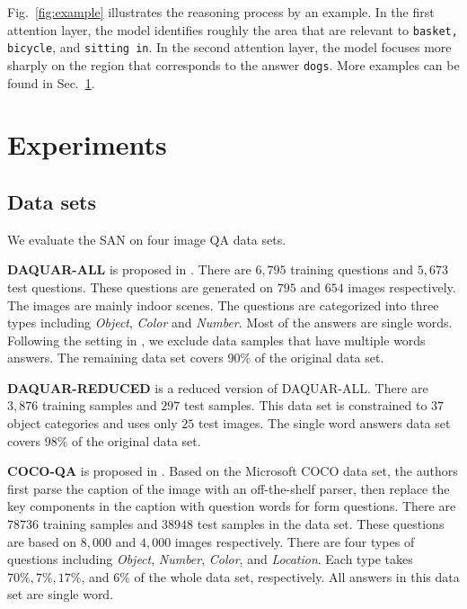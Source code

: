 \documentclass[10pt,twocolumn,letterpaper]{article}
\begin{document}
Fig.~\ref{fig:example} illustrates the reasoning process by an example. In the
first attention layer, the model identifies roughly the area that are relevant
to \texttt{basket, bicycle}, and \texttt{sitting in}. In the second attention
layer, the model focuses more sharply on the region that corresponds to the
answer \texttt{dogs}. More examples can be found in Sec.~\ref{sec:experiments}.

\section{Experiments}
\label{sec:experiments}
\subsection{Data sets}
We evaluate the SAN on four image QA data sets.

{\bf DAQUAR-ALL} is proposed in \cite{malinowski2014multi}. There are $6,795$
training questions and $5,673$ test questions. These questions are generated on
$795$ and $654$ images respectively. The images are mainly indoor scenes. The
questions are categorized into three types including \emph{Object},
\emph{Color} and \emph{Number}. Most of the answers are single words. Following
the setting in \cite{ren2015imageqa, ma2015learning, malinowski2015ask}, we
exclude data samples that have multiple words answers. The remaining data set
covers $90\%$ of the original data set.

{\bf DAQUAR-REDUCED} is a reduced version of DAQUAR-ALL. There are $3,876$
training samples and $297$ test samples. This data set is constrained to $37$
object categories and uses only $25$ test images. The single word answers data
set covers $98\%$ of the original data set.


{\bf COCO-QA} is proposed in \cite{ren2015imageqa}. Based on the Microsoft COCO
data set, the authors first parse the caption of the image with an
off-the-shelf parser, then replace the key components in the caption with
question words for form questions. There are $78736$ training samples and
$38948$ test samples in the data set. These questions are based on $8,000$ and
$4,000$ images respectively. There are four types of questions including
\emph{Object}, \emph{Number}, \emph{Color}, and \emph{Location}. Each type
takes $70\%, 7\%, 17\%$, and $6\%$ of the whole data set, respectively. All
answers in this data set are single word.
\end{document}

